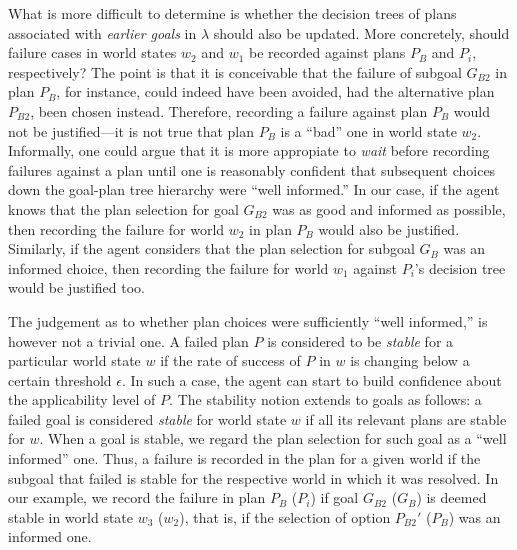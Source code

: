 What is more difficult to determine is whether the decision trees of plans
associated with \emph{earlier goals} in $\lambda$ should also be updated.
More concretely, should failure cases in world states $w_2$ and $w_1$ be recorded
against plans $P_B$ and $P_i$, respectively?
The point is that it is conceivable that the failure of subgoal $G_{B2}$ in plan
$P_B$, for instance, could indeed have been avoided, had the alternative plan
$P_{B2}$, been chosen instead. Therefore, recording a failure against plan $P_B$
would not be justified---it is not true that plan $P_{B}$ is a ``bad'' one
in world state $w_2$.
Informally, one could argue that it is more appropiate to \emph{wait} before
recording failures against a plan until one is reasonably confident that
subsequent choices down the goal-plan tree hierarchy were ``well informed.'' In
our case, if the agent knows that the plan selection for goal $G_{B2}$ was as
good and informed as possible, then recording the failure for world $w_2$ in plan
$P_B$ would also be justified. Similarly, if the agent considers that the plan
selection for subgoal $G_B$ was an informed choice, then recording the failure
for world $w_1$ against $P_i$'s decision tree would be justified too.


\newcommand{\procedurefont}[1]{\mathsf{#1}}
\newcommand{\StableGoal}{\procedurefont{StableGoal}}
\newcommand{\RecordTrace}{\procedurefont{RecordFailedTrace}}
\newcommand{\RecordWorldDT}{\procedurefont{RecordWorldDT}}




The judgement as to whether plan choices were sufficiently ``well informed,'' is
however not a trivial one.  A failed plan $P$ is considered to be \emph{stable} for a
particular world state $w$ if the rate of success of $P$ in $w$ is changing below
a certain threshold $\epsilon$. In such a case, the agent can start to build
confidence about the applicability level of $P$. The stability notion extends to
goals as follows: a failed goal is considered \emph{stable} for world state $w$ 
if all its relevant plans are stable for $w$.
When a goal is stable, we regard the plan selection for such goal as a ``well
informed'' one. Thus, a failure is recorded in the plan for a given world if the subgoal that failed is stable for the respective world in which it was resolved. In our example, we
record the failure in plan $P_B$ ($P_i$) if goal $G_{B2}$ ($G_B$) is deemed stable
in world state $w_3$ ($w_2$), that is, if the selection of option $P_{B2}'$
($P_B$) was an informed one.



